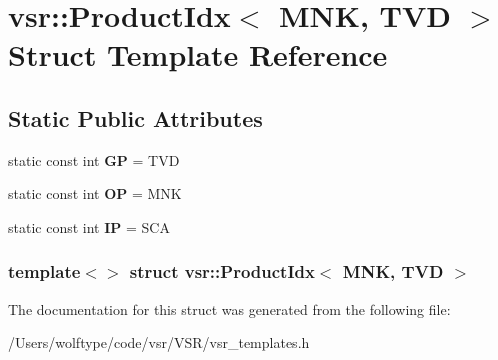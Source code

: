 \hypertarget{structvsr_1_1_product_idx_3_01_m_n_k_00_01_t_v_d_01_4}{\section{vsr\-:\-:Product\-Idx$<$ M\-N\-K, T\-V\-D $>$ Struct Template Reference}
\label{structvsr_1_1_product_idx_3_01_m_n_k_00_01_t_v_d_01_4}
}
\subsection*{Static Public Attributes}
\begin{DoxyCompactItemize}
\item 
\hypertarget{structvsr_1_1_product_idx_3_01_m_n_k_00_01_t_v_d_01_4_a16262d3f14e7e464e6a2f3f298870341}{static const int {\bfseries G\-P} = T\-V\-D}\label{structvsr_1_1_product_idx_3_01_m_n_k_00_01_t_v_d_01_4_a16262d3f14e7e464e6a2f3f298870341}

\item 
\hypertarget{structvsr_1_1_product_idx_3_01_m_n_k_00_01_t_v_d_01_4_a9285e0db58b36c303bf696ac5e3cd9b8}{static const int {\bfseries O\-P} = M\-N\-K}\label{structvsr_1_1_product_idx_3_01_m_n_k_00_01_t_v_d_01_4_a9285e0db58b36c303bf696ac5e3cd9b8}

\item 
\hypertarget{structvsr_1_1_product_idx_3_01_m_n_k_00_01_t_v_d_01_4_a434d5c662fb7744844893d80123cb01d}{static const int {\bfseries I\-P} = S\-C\-A}\label{structvsr_1_1_product_idx_3_01_m_n_k_00_01_t_v_d_01_4_a434d5c662fb7744844893d80123cb01d}

\end{DoxyCompactItemize}
\subsubsection*{template$<$$>$ struct vsr\-::\-Product\-Idx$<$ M\-N\-K, T\-V\-D $>$}



The documentation for this struct was generated from the following file\-:\begin{DoxyCompactItemize}
\item 
/\-Users/wolftype/code/vsr/\-V\-S\-R/vsr\-\_\-templates.\-h\end{DoxyCompactItemize}
